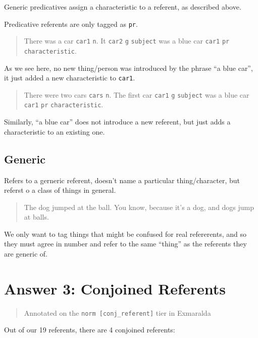 \documentclass[
]{book}
\begin{document}
Generic predicatives assign a characteristic to a referent,
as described above.

Predicative referents are only tagged as \texttt{pr}.

\begin{quote}
There was a car \texttt{car1} \texttt{n}.
It \texttt{car2} \texttt{g} \texttt{subject} was a blue car \texttt{car1} \texttt{pr} \texttt{characteristic}.
\end{quote}

As we see here, no new thing/person was introduced by the phrase ``a blue car'', it just added a new characteristic to \texttt{car1}.

\begin{quote}
There were two cars \texttt{cars} \texttt{n}.
The first car \texttt{car1} \texttt{g} \texttt{subject} was a blue car \texttt{car1} \texttt{pr} \texttt{characteristic}.
\end{quote}

Similarly, ``a blue car'' does not introduce a new referent, but just adds a characteristic to an existing one.

\hypertarget{generic}{%
\section{Generic}\label{generic}}

Refers to a gerneric referent, doesn't name a particular thing/character, but referst o a class of things in general.

\begin{quote}
The dog jumped at the ball.
You know, because it's a dog, and dogs jump at balls.
\end{quote}

We only want to tag things that might be confused for real refererents, and so they must agree in number and refer to the same ``thing'' as the referents they are generic of.

\hypertarget{answer-3-conjoined-referents}{%
\chapter{Answer 3: Conjoined Referents}\label{answer-3-conjoined-referents}}

\begin{quote}
Annotated on the \texttt{norm\ {[}conj\_referent{]}} tier in Exmaralda
\end{quote}

Out of our 19 referents, there are 4 conjoined referents:
\end{document}

